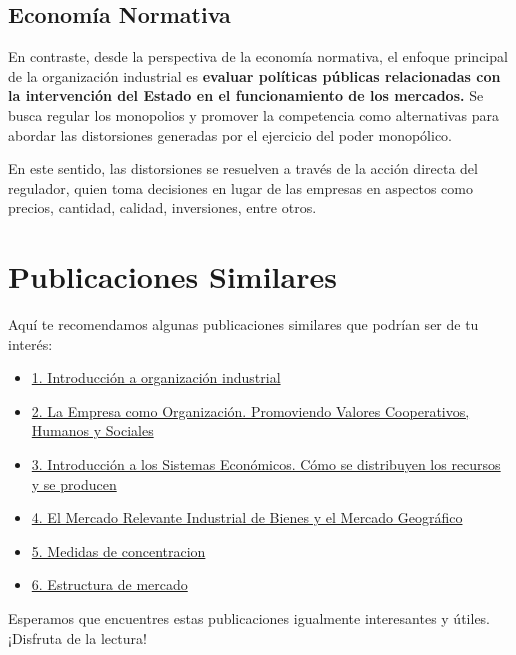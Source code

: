 \documentclass[
  letterpaper,
  DIV=11,
  numbers=noendperiod]{scrartcl}
\begin{document}
\hypertarget{economuxeda-normativa}{%
\subsection{Economía Normativa}\label{economuxeda-normativa}}

En contraste, desde la perspectiva de la economía normativa, el enfoque
principal de la organización industrial es \textbf{evaluar políticas
públicas relacionadas con la intervención del Estado en el
funcionamiento de los mercados.} Se busca regular los monopolios y
promover la competencia como alternativas para abordar las distorsiones
generadas por el ejercicio del poder monopólico.

En este sentido, las distorsiones se resuelven a través de la acción
directa del regulador, quien toma decisiones en lugar de las empresas en
aspectos como precios, cantidad, calidad, inversiones, entre otros.

\hypertarget{publicaciones-similares}{%
\section{Publicaciones Similares}\label{publicaciones-similares}}

Aquí te recomendamos algunas publicaciones similares que podrían ser de
tu interés:

\begin{itemize}
\item
  \href{../2023-06-12-introducion-organizacion-industrial/index.qmd}{1.
  Introducción a organización industrial}
\item
  \href{../2023-06-13-empresa-como-organizacion/index.qmd}{2. La Empresa
  como Organización. Promoviendo Valores Cooperativos, Humanos y
  Sociales}
\item
  \href{../2023-06-13-sistemas-economicos/index.qmd}{3. Introducción a
  los Sistemas Económicos. Cómo se distribuyen los recursos y se
  producen}
\item
  \href{../2023-06-15-mercado-relevante-oi-cap-2/index.qmd}{4. El
  Mercado Relevante Industrial de Bienes y el Mercado Geográfico}
\item
  \href{../2023-06-16-concentracion-poder-oi-cap3/index.qmd}{5. Medidas
  de concentracion}
\item
  \href{../2023-06-17-estructura-mercado-oi-cap4/index.qmd}{6.
  Estructura de mercado}
\end{itemize}

Esperamos que encuentres estas publicaciones igualmente interesantes y
útiles. ¡Disfruta de la lectura!


\printbibliography
\end{document}

